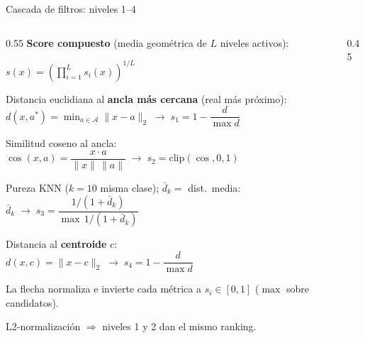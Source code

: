 \begin{frame}{Cascada de filtros: niveles 1--4}
\begin{columns}[T]

\begin{column}{0.55\textwidth}
\small
\textbf{Score compuesto} (media geométrica de $L$ niveles activos):\\[2pt]
\centerline{$\displaystyle s(x) = \left(\prod_{i=1}^{L} s_i(x)\right)^{1/L}$}

\vspace{0.1em}
\begin{description}\scriptsize
  \item[Nivel 1 \alert{$\star$}] Distancia euclidiana al \textbf{ancla más cercana} (real más próximo):\\
    $d(x,a^{*}) = \min_{a\in\mathcal{A}} \|x-a\|_2
      \;\longrightarrow\; s_1 = 1-\dfrac{d}{\max d}$
  \item[Nivel 2] Similitud coseno al ancla:\\
    $\cos(x,a) = \dfrac{x\cdot a}{\|x\|\,\|a\|}
      \;\longrightarrow\; s_2 = \mathrm{clip}(\cos,0,1)$
  \item[Nivel 3] Pureza KNN ($k=10$ misma clase); $\bar d_k=$ dist.\ media:\\
    $\bar d_k
      \;\longrightarrow\; s_3 = \dfrac{1/(1+\bar d_k)}{\max\, 1/(1+\bar d_k)}$
  \item[Nivel 4] Distancia al \textbf{centroide} $c$:\\
    $d(x,c) = \|x-c\|_2
      \;\longrightarrow\; s_4 = 1-\dfrac{d}{\max d}$
\end{description}

{\tiny La flecha normaliza e invierte cada métrica a $s_i\!\in\![0,1]$ ($\max$ sobre candidatos).}

\vspace{0.05em}
\begin{insight}
\scriptsize L2-normalización $\Rightarrow$ niveles 1 y 2 dan el mismo ranking.
\end{insight}
\end{column}

\begin{column}{0.45\textwidth}
\centering
{}
\end{column}
\end{columns}
\end{frame}
